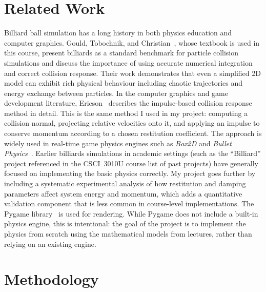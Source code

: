 \documentclass[12pt, letterpaper]{article}
\begin{document}
\section{Related Work}
Billiard ball simulation has a long history in both physics education
and computer graphics.
Gould, Tobochnik, and Christian~\cite{gould2007}, whose textbook is
used in this course, present billiards as a standard benchmark for
particle collision simulations and discuss the importance of using
accurate numerical integration and correct collision response.
Their work demonstrates that even a simplified 2D model can exhibit
rich physical behaviour including chaotic trajectories and energy
exchange between particles.
In the computer graphics and game development literature,
Ericson~\cite{ericson2004} describes the impulse-based collision
response method in detail.
This is the same method I used in my project: computing a collision
normal, projecting relative velocities onto it, and applying an
impulse to conserve momentum according to a chosen restitution
coefficient.
The approach is widely used in real-time game physics engines such
as \textit{Box2D} and \textit{Bullet Physics}~\cite{bullet}.
Earlier billiards simulations in academic settings
(such as the ``Billiard'' project referenced in the CSCI~3010U course
list of past projects) have generally focused on implementing the
basic physics correctly.
My project goes further by including a systematic experimental analysis
of how restitution and damping parameters affect system energy
and momentum, which adds a quantitative validation component
that is less common in course-level implementations.
The Pygame library~\cite{pygame} is used for rendering.
While Pygame does not include a built-in physics engine,
this is intentional: the goal of the project is to implement the
physics from scratch using the mathematical models from lectures,
rather than relying on an existing engine.
\section{Methodology}
\end{document}
